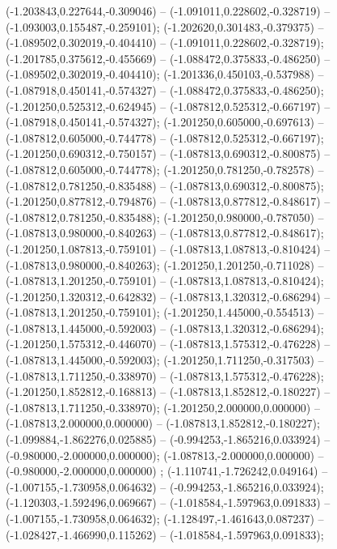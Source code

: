  (-1.203843,0.227644,-0.309046) -- (-1.091011,0.228602,-0.328719) -- (-1.093003,0.155487,-0.259101);
 (-1.202620,0.301483,-0.379375) -- (-1.089502,0.302019,-0.404410) -- (-1.091011,0.228602,-0.328719);
 (-1.201785,0.375612,-0.455669) -- (-1.088472,0.375833,-0.486250) -- (-1.089502,0.302019,-0.404410);
 (-1.201336,0.450103,-0.537988) -- (-1.087918,0.450141,-0.574327) -- (-1.088472,0.375833,-0.486250);
 (-1.201250,0.525312,-0.624945) -- (-1.087812,0.525312,-0.667197) -- (-1.087918,0.450141,-0.574327);
 (-1.201250,0.605000,-0.697613) -- (-1.087812,0.605000,-0.744778) -- (-1.087812,0.525312,-0.667197);
 (-1.201250,0.690312,-0.750157) -- (-1.087813,0.690312,-0.800875) -- (-1.087812,0.605000,-0.744778);
 (-1.201250,0.781250,-0.782578) -- (-1.087812,0.781250,-0.835488) -- (-1.087813,0.690312,-0.800875);
 (-1.201250,0.877812,-0.794876) -- (-1.087813,0.877812,-0.848617) -- (-1.087812,0.781250,-0.835488);
 (-1.201250,0.980000,-0.787050) -- (-1.087813,0.980000,-0.840263) -- (-1.087813,0.877812,-0.848617);
 (-1.201250,1.087813,-0.759101) -- (-1.087813,1.087813,-0.810424) -- (-1.087813,0.980000,-0.840263);
 (-1.201250,1.201250,-0.711028) -- (-1.087813,1.201250,-0.759101) -- (-1.087813,1.087813,-0.810424);
 (-1.201250,1.320312,-0.642832) -- (-1.087813,1.320312,-0.686294) -- (-1.087813,1.201250,-0.759101);
 (-1.201250,1.445000,-0.554513) -- (-1.087813,1.445000,-0.592003) -- (-1.087813,1.320312,-0.686294);
 (-1.201250,1.575312,-0.446070) -- (-1.087813,1.575312,-0.476228) -- (-1.087813,1.445000,-0.592003);
 (-1.201250,1.711250,-0.317503) -- (-1.087813,1.711250,-0.338970) -- (-1.087813,1.575312,-0.476228);
 (-1.201250,1.852812,-0.168813) -- (-1.087813,1.852812,-0.180227) -- (-1.087813,1.711250,-0.338970);
 (-1.201250,2.000000,0.000000) -- (-1.087813,2.000000,0.000000) -- (-1.087813,1.852812,-0.180227);
 (-1.099884,-1.862276,0.025885) -- (-0.994253,-1.865216,0.033924) -- (-0.980000,-2.000000,0.000000);
 (-1.087813,-2.000000,0.000000) -- (-0.980000,-2.000000,0.000000) ;
 (-1.110741,-1.726242,0.049164) -- (-1.007155,-1.730958,0.064632) -- (-0.994253,-1.865216,0.033924);
 (-1.120303,-1.592496,0.069667) -- (-1.018584,-1.597963,0.091833) -- (-1.007155,-1.730958,0.064632);
 (-1.128497,-1.461643,0.087237) -- (-1.028427,-1.466990,0.115262) -- (-1.018584,-1.597963,0.091833);

